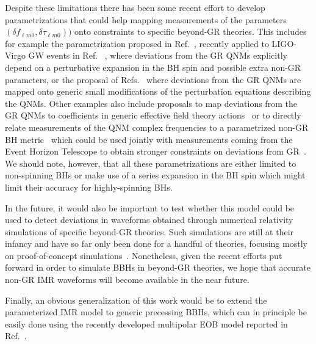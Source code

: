 Despite these limitations there has been some recent effort to develop parametrizations that could help mapping measurements of the parameters $(\delta f_{\ell m 0}, \delta \tau_{\ell m0}))$ onto constraints to specific beyond-GR theories. This includes for example the parametrization proposed in Ref.~\cite{Maselli:2019mjd}, recently applied to LIGO-Virgo GW events in Ref. ~\cite{Carullo:2021dui}, where deviations from the GR QNMs explicitly depend on a perturbative expansion in the BH spin and possible extra non-GR parameters, or the proposal of Refs.~\cite{Cardoso:2019mqo,McManus:2019ulj} where deviations from the GR QNMs are mapped onto generic small modifications of the perturbation equations describing the QNMs. Other examples also include proposals to map deviations from the GR QNMs to coefficients in generic effective field theory actions~\cite{Cardoso:2018ptl,Franciolini:2018uyq,Cano:2020cao} or to directly relate measurements of the QNM complex frequencies to a parametrized non-GR BH metric~\cite{Glampedakis:2017dvb,Suvorov:2021amy,Volkel:2020daa} which could be used jointly with measurements coming from the Event Horizon Telescope to obtain stronger constraints on deviations from GR~\cite{Volkel:2020daa,Volkel:2020xlc,Psaltis:2020lvx,Yang:2021zqy}.
We should note, however, that all these parametrizations are either limited to non-spinning BHs or make use of a series expansion in the BH spin which might limit their accuracy for highly-spinning BHs. 

In the future, it would also be important to test whether this model could be used to detect deviations in waveforms obtained through numerical relativity simulations of specific beyond-GR theories. Such simulations are still at their infancy and have so far only been done for a handful of theories, focusing mostly on proof-of-concept simulations~\cite{Healy:2011ef,Berti:2013gfa,Cao:2013osa,Okounkova:2017yby,Hirschmann:2017psw,Witek:2018dmd,Okounkova:2019dfo,Okounkova:2019zjf,Okounkova:2020rqw,East:2020hgw}. Nonetheless, given the recent efforts put forward in order to simulate BBHs in beyond-GR theories, we hope that accurate non-GR IMR waveforms will become available in the near future.

Finally, an obvious generalization of this work would be to extend the parameterized IMR model to generic precessing BBHs, which can in principle be easily done using the recently developed multipolar EOB model reported in Ref.~\cite{Ossokine:2020kjp}.
